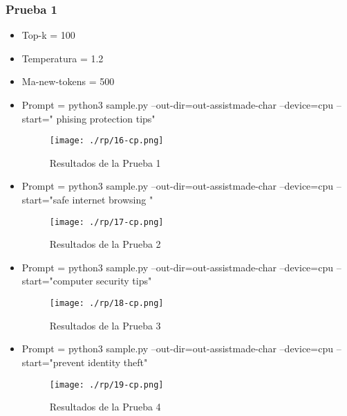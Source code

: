 \subsubsection{ Prueba 1}\label{section:Adaptación de modelo nanoGPT}
    \begin{itemize}
        \item   Top-k = 100
        \item   Temperatura = 1.2
        \item   Ma-new-tokens = 500
        \item    Prompt = python3 sample.py --out-dir=out-assistmade-char --device=cpu --start=" phising protection tips"
    
\begin{figure}[H]
   \centering %
       \texttt{[image: ./rp/16-cp.png]} 
   \caption{Resultados de la Prueba 1\cite{}}
  \label{figure:Resultado 1}  %
\end{figure}
        \item   Prompt = python3 sample.py --out-dir=out-assistmade-char --device=cpu --start="safe internet browsing "
\begin{figure}[H]
   \centering %
       \texttt{[image: ./rp/17-cp.png]} 
   \caption{Resultados de la Prueba 2\cite{}}
  \label{figure:Resultado 1}  %
\end{figure}
        \item   Prompt = python3 sample.py –out-dir=out-assistmade-char --device=cpu --start="computer security tips"
\begin{figure}[H]
   \centering %
       \texttt{[image: ./rp/18-cp.png]} 
   \caption{Resultados de la Prueba 3\cite{}}
  \label{figure:Resultado 1}  %
\end{figure}
        \item   Prompt = python3 sample.py --out-dir=out-assistmade-char --device=cpu --start="prevent identity theft"
\begin{figure}[H]
   \centering %
       \texttt{[image: ./rp/19-cp.png]} 
   \caption{Resultados de la Prueba 4\cite{}}
  \label{figure:Resultado 1}  %
\end{figure}
\end{itemize}
